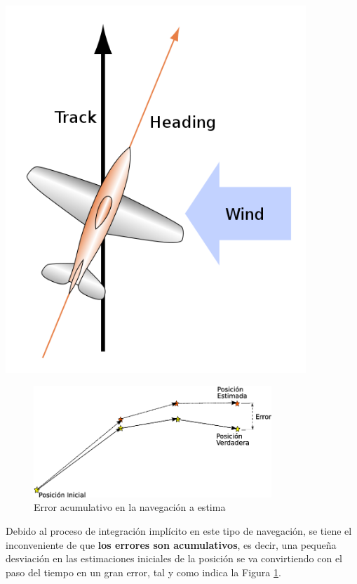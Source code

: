 \documentclass[a4paper,12pt,twoside]{article}
\begin{document}
\begin{minipage}[b]{0.30\linewidth} \centering
  \includegraphics[width=0.85\textwidth]{Imagenes/ajuste-viento.png}
\end{minipage}

\begin{figure}[!h]
  \centering
  \includegraphics[keepaspectratio,width=0.8\textwidth]{./Imagenes/dead-reckoning-error.png}  
  \caption{Error acumulativo en la navegaci\'on a estima \cite{Salazar_nav_aerea}}
  \label{fig:dead-reckoning-error}
\end{figure}

      
Debido al proceso de integraci\'on impl\'icito en este tipo de navegaci\'on, se tiene el inconveniente de que \textbf{los errores son acumulativos}, es decir, una peque\~na desviaci\'on en las estimaciones iniciales de la posici\'on se va convirtiendo con el paso del tiempo en un gran error, tal y como indica la Figura \ref{fig:dead-reckoning-error}.
\end{document}

